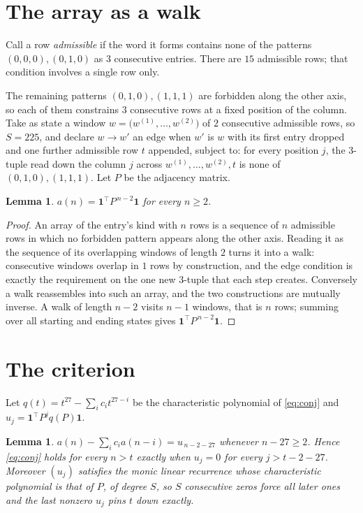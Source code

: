 \documentclass[11pt,a4paper]{article}
\theoremstyle{plain}
\newtheorem{lemma}[theorem]{Lemma}
\theoremstyle{definition}
\begin{document}
\section{The array as a walk}

Call a row \emph{admissible} if the word it forms contains none of the patterns
$(0,0,0), (0,1,0)$ as $3$ consecutive entries. There are $15$ admissible rows; that condition
involves a single row only.

The remaining patterns $(0,1,0), (1,1,1)$ are forbidden along the other axis, so each of them
constrains $3$ consecutive rows at a fixed position of the column. Take as state a
window $w=\bigl(w^{(1)},\dots,w^{(2)}\bigr)$ of $2$ consecutive admissible
rows, so $S=225$, and declare $w\to w'$ an edge when $w'$ is $w$ with its first entry
dropped and one further admissible row $t$ appended, subject to: for every position
$j$, the $3$-tuple read down the column $j$ across $w^{(1)},\dots,w^{(2)},t$
is none of $(0,1,0), (1,1,1)$. Let $P$ be the adjacency matrix.

\begin{lemma}\label{lem:walk}
$a(n)=\mathbf{1}^{\!\top}P^{\,n-2}\mathbf{1}$ for every $n\ge2$.
\end{lemma}

\begin{proof}
An array of the entry's kind with $n$ rows is a sequence of $n$ admissible rows in
which no forbidden pattern appears along the other axis. Reading it as the sequence of its
overlapping windows of length $2$ turns it into a walk: consecutive windows overlap in
$1$ rows by construction, and the edge condition is exactly the requirement on the one
new $3$-tuple that each step creates. Conversely a walk reassembles into such an array,
and the two constructions are mutually inverse. A walk of length $n-2$ visits $n-1$
windows, that is $n$ rows; summing over all starting and ending states gives
$\mathbf{1}^{\!\top}P^{\,n-2}\mathbf{1}$.
\end{proof}

\section{The criterion}

Let $q(t)=t^{27}-\sum_i c_i t^{27-i}$ be the characteristic polynomial of
\eqref{eq:conj} and $u_j=\mathbf{1}^{\!\top}P^{j}q(P)\mathbf{1}$.

\begin{lemma}\label{lem:crit}
$a(n)-\sum_i c_i a(n-i)=u_{\,n-2-27}$ whenever $n-27\ge2$. Hence
\eqref{eq:conj} holds for every $n>t$ exactly when $u_j=0$ for every
$j>t-2-27$. Moreover $(u_j)$ satisfies the monic linear recurrence whose
characteristic polynomial is that of $P$, of degree $S$, so $S$ consecutive zeros force all
later ones and the last nonzero $u_j$ pins $t$ down exactly.
\end{lemma}
\end{document}
